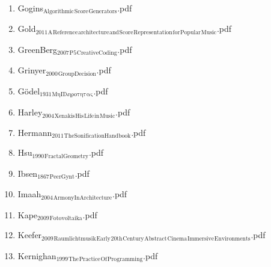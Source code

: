 \documentclass[11pt]{article}
\begin{document}
\begin{enumerate}
\begin{enumerate}
\begin{enumerate}
\begin{enumerate}
\begin{enumerate}
\item Gogins$_{\text{Algorithmic}}$$_{\text{Score}}$$_{\text{Generators}}$.pdf
\label{sec-1-1-1-1-7-1-1-37}

\item Gold$_{\text{2011}}$$_{\text{A}}$$_{\text{Reference}}$$_{\text{architecture}}$$_{\text{and}}$$_{\text{Score}}$$_{\text{Representation}}$$_{\text{for}}$$_{\text{Popular}}$$_{\text{Music}}$.pdf
\label{sec-1-1-1-1-7-1-1-38}

\item GreenBerg$_{\text{2007}}$$_{\text{P5}}$$_{\text{CreativeCoding}}$.pdf
\label{sec-1-1-1-1-7-1-1-39}

\item Grinyer$_{\text{2000}}$$_{\text{GroupDecision}}$.pdf
\label{sec-1-1-1-1-7-1-1-40}

\item Gödel$_{\text{1931}}$$_{\text{ΜηΠληροτητας}}$.pdf
\label{sec-1-1-1-1-7-1-1-41}

\item Harley$_{\text{2004}}$$_{\text{Xenakis}}$$_{\text{His}}$$_{\text{Life}}$$_{\text{in}}$$_{\text{Music}}$.pdf
\label{sec-1-1-1-1-7-1-1-42}

\item Hermann$_{\text{2011}}$$_{\text{TheSonificationHandbook}}$.pdf
\label{sec-1-1-1-1-7-1-1-43}

\item Hsu$_{\text{1990}}$$_{\text{FractalGeometry}}$.pdf
\label{sec-1-1-1-1-7-1-1-44}

\item Ibsen$_{\text{1867}}$$_{\text{PeerGynt}}$.pdf
\label{sec-1-1-1-1-7-1-1-45}

\item Imaah$_{\text{2004}}$$_{\text{ArmonyInArchitecture}}$.pdf
\label{sec-1-1-1-1-7-1-1-46}

\item Kape$_{\text{2009}}$$_{\text{Fotovoltaika}}$.pdf
\label{sec-1-1-1-1-7-1-1-47}

\item Keefer$_{\text{2009}}$$_{\text{Raumlichtmusik}}$$_{\text{Early}}$$_{\text{20th}}$$_{\text{Century}}$$_{\text{Abstract}}$$_{\text{Cinema}}$$_{\text{Immersive}}$$_{\text{Environments}}$.pdf
\label{sec-1-1-1-1-7-1-1-48}

\item Kernighan$_{\text{1999}}$$_{\text{The}}$$_{\text{Practice}}$$_{\text{Of}}$$_{\text{Programming}}$.pdf
\label{sec-1-1-1-1-7-1-1-49}


\end{enumerate}
\end{enumerate}
\end{enumerate}
\end{enumerate}
\end{enumerate}
\end{document}
